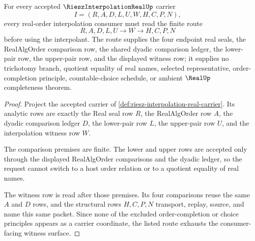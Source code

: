 \begin{theorem}
\label{thm:riesz-interpolation-real-dyadic-witness}
For every accepted $\RieszInterpolationRealUp$ carrier
$$
I=(R,A,D,L,U,W,H,C,P,N),
$$
every real-order interpolation consumer must read the finite route
$$
R,A,D,L,U \longrightarrow W \longrightarrow H,C,P,N
$$
before using the interpolant. The route supplies the four endpoint real seals, the RealAlgOrder comparison row, the shared dyadic comparison ledger, the lower-pair row, the upper-pair row, and the displayed witness row; it supplies no trichotomy branch, quotient equality of real names, selected representative, order-completion principle, countable-choice schedule, or ambient $\RealUp$ completeness theorem.
\end{theorem}
\begin{proof}
Project the accepted carrier of \autoref{def:riesz-interpolation-real-carrier}. Its analytic rows are exactly the Real seal row $R$, the RealAlgOrder row $A$, the dyadic comparison ledger $D$, the lower-pair row $L$, the upper-pair row $U$, and the interpolation witness row $W$.

The comparison premises are finite. The lower and upper rows are accepted only through the displayed RealAlgOrder comparisons and the dyadic ledger, so the request cannot switch to a host order relation or to a quotient equality of real names.

The witness row is read after those premises. Its four comparisons reuse the same $A$ and $D$ rows, and the structural rows $H,C,P,N$ transport, replay, source, and name this same packet. Since none of the excluded order-completion or choice principles appears as a carrier coordinate, the listed route exhausts the consumer-facing witness surface.
\end{proof}

